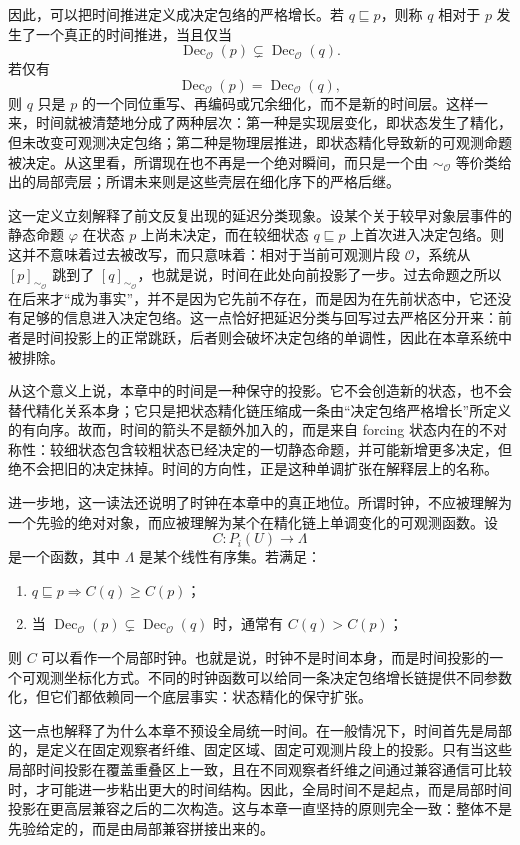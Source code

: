 因此，可以把时间推进定义成决定包络的严格增长。若 \(q\sqsubseteq p\)，则称 \(q\) 相对于 \(p\) 发生了一个真正的时间推进，当且仅当
\[
\operatorname{Dec}_{\mathcal O}(p)\subsetneq \operatorname{Dec}_{\mathcal O}(q).
\]
若仅有
\[
\operatorname{Dec}_{\mathcal O}(p)=\operatorname{Dec}_{\mathcal O}(q),
\]
则 \(q\) 只是 \(p\) 的一个同位重写、再编码或冗余细化，而不是新的时间层。这样一来，时间就被清楚地分成了两种层次：第一种是实现层变化，即状态发生了精化，但未改变可观测决定包络；第二种是物理层推进，即状态精化导致新的可观测命题被决定。从这里看，所谓现在也不再是一个绝对瞬间，而只是一个由 \(\sim_{\mathcal O}\) 等价类给出的局部壳层；所谓未来则是这些壳层在细化序下的严格后继。

这一定义立刻解释了前文反复出现的延迟分类现象。设某个关于较早对象层事件的静态命题 \(\varphi\) 在状态 \(p\) 上尚未决定，而在较细状态 \(q\sqsubseteq p\) 上首次进入决定包络。则这并不意味着过去被改写，而只意味着：相对于当前可观测片段 \(\mathcal O\)，系统从 \([p]_{\sim_{\mathcal O}}\) 跳到了 \([q]_{\sim_{\mathcal O}}\)，也就是说，时间在此处向前投影了一步。过去命题之所以在后来才“成为事实”，并不是因为它先前不存在，而是因为在先前状态中，它还没有足够的信息进入决定包络。这一点恰好把延迟分类与回写过去严格区分开来：前者是时间投影上的正常跳跃，后者则会破坏决定包络的单调性，因此在本章系统中被排除。

从这个意义上说，本章中的时间是一种保守的投影。它不会创造新的状态，也不会替代精化关系本身；它只是把状态精化链压缩成一条由“决定包络严格增长”所定义的有向序。故而，时间的箭头不是额外加入的，而是来自 forcing 状态内在的不对称性：较细状态包含较粗状态已经决定的一切静态命题，并可能新增更多决定，但绝不会把旧的决定抹掉。时间的方向性，正是这种单调扩张在解释层上的名称。

进一步地，这一读法还说明了时钟在本章中的真正地位。所谓时钟，不应被理解为一个先验的绝对对象，而应被理解为某个在精化链上单调变化的可观测函数。设
\[
C:P_i(U)\to \Lambda
\]
是一个函数，其中 \(\Lambda\) 是某个线性有序集。若满足：
\begin{enumerate}
  \item \(q\sqsubseteq p \Rightarrow C(q)\ge C(p)\)；
  \item 当 \(\operatorname{Dec}_{\mathcal O}(p)\subsetneq \operatorname{Dec}_{\mathcal O}(q)\) 时，通常有 \(C(q)>C(p)\)；
\end{enumerate}
则 \(C\) 可以看作一个局部时钟。也就是说，时钟不是时间本身，而是时间投影的一个可观测坐标化方式。不同的时钟函数可以给同一条决定包络增长链提供不同参数化，但它们都依赖同一个底层事实：状态精化的保守扩张。

这一点也解释了为什么本章不预设全局统一时间。在一般情况下，时间首先是局部的，是定义在固定观察者纤维、固定区域、固定可观测片段上的投影。只有当这些局部时间投影在覆盖重叠区上一致，且在不同观察者纤维之间通过兼容通信可比较时，才可能进一步粘出更大的时间结构。因此，全局时间不是起点，而是局部时间投影在更高层兼容之后的二次构造。这与本章一直坚持的原则完全一致：整体不是先验给定的，而是由局部兼容拼接出来的。

